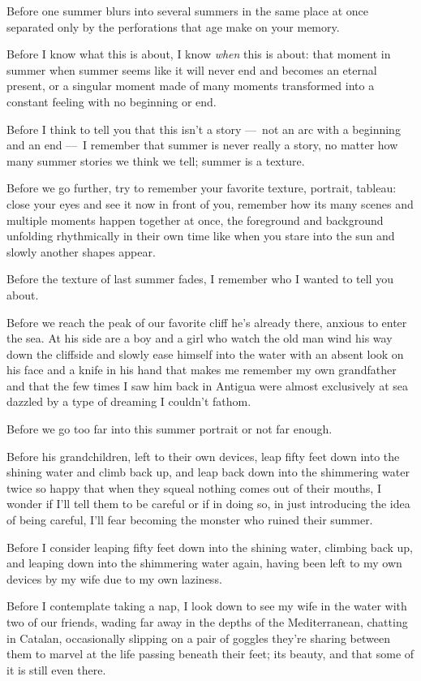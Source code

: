 Before one summer blurs into several summers in the same place at once
separated only by the perforations that age make on your memory.

Before I know what this is about, I know \emph{when} this is about: that
moment in summer when summer seems like it will never end and becomes an
eternal present, or a singular moment made of many moments transformed
into a constant feeling with no beginning or end.

Before I think to tell you that this isn't a story ---~not an arc with a
beginning and an end ---~I remember that summer is never really a story,
no matter how many summer stories we think we tell; summer is a texture.

Before we go further, try to remember your favorite texture, portrait,
tableau: close your eyes and see it now in front of you, remember how
its many scenes and multiple moments happen together at once, the
foreground and background unfolding rhythmically in their own time like
when you stare into the sun and slowly another shapes appear.

Before the texture of last summer fades, I remember who I wanted to tell
you about.

Before we reach the peak of our favorite cliff he's already there,
anxious to enter the sea. At his side are a boy and a girl who watch the
old man wind his way down the cliffside and slowly ease himself into the
water with an absent look on his face and a knife in his hand that makes
me remember my own grandfather and that the few times I saw him back in
Antigua were almost exclusively at sea dazzled by a type of dreaming I
couldn't fathom.

Before we go too far into this summer portrait or not far enough.

Before his grandchildren, left to their own devices, leap fifty feet
down into the shining water and climb back up, and leap back down into
the shimmering water twice so happy that when they squeal nothing comes
out of their mouths, I wonder if I'll tell them to be careful or if in
doing so, in just introducing the idea of being careful, I'll fear
becoming the monster who ruined their summer.

Before I consider leaping fifty feet down into the shining water,
climbing back up, and leaping down into the shimmering water again,
having been left to my own devices by my wife due to my own laziness.

Before I contemplate taking a nap, I look down to see my wife in the
water with two of our friends, wading far away in the depths of the
Mediterranean, chatting in Catalan, occasionally slipping on a pair of
goggles they're sharing between them to marvel at the life passing
beneath their feet; its beauty, and that some of it is still even there.

